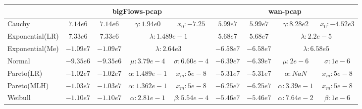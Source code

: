 \begin{table}[h!]
{\begin{tabular}{lcccccccc}
				& \multicolumn{4}{c}{bigFlows-pcap} & \multicolumn{4}{c}{wan-pcap}  \\ \hline
Cauchy          & $7.14e6$    & $7.14e6$   & $\gamma:1.94e0$ &$x_0:-7.25$    
				& $5.99e7$    & $5.99e7$   & $ \gamma:8.28e2$ &$x_0:-4.52e3$    \\
Exponential(LR) & $7.33e6$    & $7.33e6$   & \multicolumn{2}{c}{$\lambda:1.489e-1$}   
				& $5.68e7$    & $ 5.68e7$  & \multicolumn{2}{c}{$\lambda:2.2e-5$}   \\
Exponential(Me) & $-1.09e7$   & $-1.09e7$  & \multicolumn{2}{c}{$\lambda:2.64e3$}   
				& $-6.58e7$   & $-6.58e7$  & \multicolumn{2}{c}{$\lambda:6.58e5$} \\
Normal          & $-9.35e6$   & $-9.35e6$  & $\mu:3.79e-4$   &$\sigma:6.60e-4$ 
				& $-6.39e7$   & $-6.39e7$  & $\mu:2e-6$     & $\sigma:1e-6$ \\
Pareto(LR)      & $-1.02e7$   & $-1.02e7$  & $\alpha:1.489e-1 $ & $x_m:5e-8 $    
				& $-5.31e7$   & $-5.31e7$  & $\alpha:NaN$ & $x_m:5e-8 $    \\
Pareto(MLH)     & $-1.03e7$   & $-1.03e7$  & $\alpha:1.362e-1$ & $x_m:5e-8 $    
				& $-6.25e7$   & $-6.25e7$  & $\alpha:3.39e-1$ & $x_m:5e-8 $    \\
Weibull         & $-1.10e7$   & $-1.10e7$  & $\alpha:2.81e-1$ & $\beta:5.54e-4$  
				& $-5.46e7$   & $-5.46e7$  & $\alpha:7.64e-2$ & $\beta:1e-6$  \\ \hline

\end{tabular}
}
\end{table}



